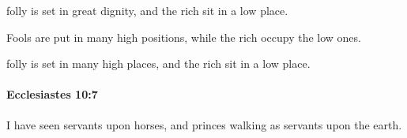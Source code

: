 			\begin{versebox}
					\item[BHS] 
					\item[LXX] 
					\item[ASV] folly is set in great dignity, and the rich sit in a low place.
					\item[NIV] Fools are put in many high positions, while the rich occupy the low ones.
					\item[NRSV] folly is set in many high places, and the rich sit in a low place.
			\end{versebox}

		\paragraph{Ecclesiastes 10:7} %
			\label{ECCLESIASTES-10-7}

			I have seen servants upon horses, and princes walking as servants upon the earth.


